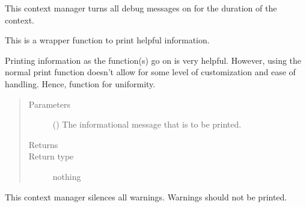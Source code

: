 \documentclass[letterpaper,10pt,english]{sphinxmanual}
\begin{document}
\begin{fulllineitems}
\label{\detokenize{python_docstrings/IfA_Smeargle.meta.errors:IfA_Smeargle.meta.errors.smeargle_enable_debug}}
This context manager turns all debug messages on for the duration of
the context.

\end{fulllineitems}


\begin{fulllineitems}
\label{\detokenize{python_docstrings/IfA_Smeargle.meta.errors:IfA_Smeargle.meta.errors.smeargle_info}}
This is a wrapper function to print helpful information.

Printing information as the function(s) go on is very helpful. However,
using the normal print function doesn’t allow for some level of
customization and ease of handling. Hence, function for uniformity.
\begin{quote}\begin{description}
\item[{Parameters}] \leavevmode
{} () \textendash{} The informational message that is to be printed.

\item[{Returns}] \leavevmode


\item[{Return type}] \leavevmode
nothing

\end{description}\end{quote}

\end{fulllineitems}


\begin{fulllineitems}
\label{\detokenize{python_docstrings/IfA_Smeargle.meta.errors:IfA_Smeargle.meta.errors.smeargle_silence_all_warnings}}
This context manager silences all warnings. Warnings should not be
printed.

\end{fulllineitems}
\end{document}
